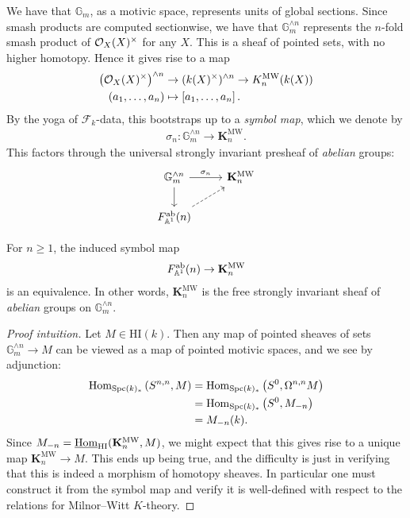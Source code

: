 \documentclass[11pt,openany]{book}
\providecommand{\HI}{\mathrm{HI}}
\providecommand{\MW}{\mathrm{MW}}
\let\smashprod\wedge
\providecommand{\KMW}{\mathbf{K}^\mathrm{MW}}
\begin{document}
We have that $\mathbb{G}_m$, as a motivic space, represents units of global sections. Since smash products are computed sectionwise, we have that $\mathbb{G}_m^{\smashprod n}$ represents the $n$-fold smash product of $\mathcal{O}_X(X)^\times$ for any $X$. This is a sheaf of pointed sets, with no higher homotopy. Hence it gives rise to a map
\begin{align*}
    \left( \O_X(X)^\times \right)^{\smashprod n} &\to (k(X)^\times)^{\smashprod n} \to K_n^\MW(k(X)) \\
    (a_1, \ldots, a_n) &\mapsto \left[ a_1, \ldots, a_n \right].
\end{align*}
By the yoga of $\mathcal{F}_k$-data, this bootstraps up to a \textit{symbol map}, which we denote by
\begin{align*}
    \sigma_n \colon \mathbb{G}_m^{\smashprod n} \to \KMW_n.
\end{align*}
%
This factors through the universal strongly invariant presheaf of \textit{abelian} groups:
\[ \begin{tikzcd}
    \mathbb{G}_m^{\smashprod n}\rar["\sigma_n"]\dar & \KMW_n\\
    F_{\A^1}^\ab(n)\ar[ur,dashed] &
\end{tikzcd} \]

\begin{theorem} \cite[3.37]{Morel} For $n\ge 1$, the induced symbol map
\begin{align*}
    F_{\A^1}^\ab(n) \to \KMW_n
\end{align*}
is an equivalence. In other words, $\KMW_n$ is the free strongly invariant sheaf of \textit{abelian} groups on $\mathbb{G}_m^{\smashprod  n}$.
\end{theorem}
\begin{proof}[Proof intuition] Let $M \in \HI(k)$. Then any map of pointed sheaves of sets $\mathbb{G}_m^{\smashprod n} \to M$ can be viewed as a map of pointed motivic spaces, and we see by adjunction:
\begin{align*}
    \mathrm{Hom}_{\mathrm{Spc}(k)_\ast} \left( S^{n,n}, M \right) &= \mathrm{Hom}_{\mathrm{Spc}(k)_\ast} \left( S^0, \Omega^{n,n} M \right) \\
    &= \mathrm{Hom}_{\mathrm{Spc}(k)_\ast} \left( S^0, M_{-n} \right) \\
    &= M_{-n}(k).
\end{align*}
Since $M_{-n} = \underline{\Hom}_{\HI}(\KMW_n, M)$, we might expect that this gives rise to a unique map $\KMW_n \to M$. This ends up being true, and the difficulty is just in verifying that this is indeed a morphism of homotopy sheaves. In particular one must construct it from the symbol map and verify it is well-defined with respect to the relations for Milnor--Witt $K$-theory.
\end{proof}
\end{document}
